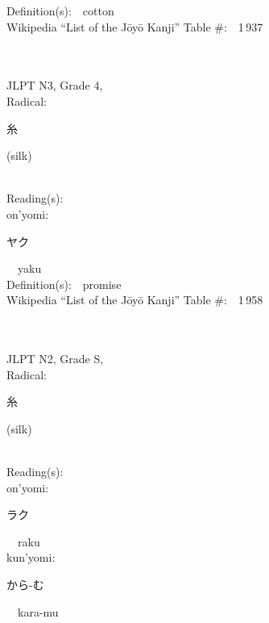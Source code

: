 \begin{multicols}{2}
Definition(s):\ \ cotton \\
Wikipedia ``List of the J\=oy\=o Kanji'' Table \#:\ \ 1\,937 \\
\ \ \\
{\fontsize{34pt}{40pt}  }\ \ \\  %
{JLPT N3, Grade 4, \\Radical:\ \ {\begin{CJK}{UTF8}{min} 糸 \end{CJK}} (silk) } \\
Reading(s):\ \ \\
{\hspace*{1em}}on'yomi:\ \ \\
{\hspace*{2em}}{\begin{CJK}{UTF8}{min} ヤク \end{CJK}}\ \ yaku\ \ \\
Definition(s):\ \ promise \\
Wikipedia ``List of the J\=oy\=o Kanji'' Table \#:\ \ 1\,958 \\
\ \ \\
{\fontsize{34pt}{40pt}  }\ \ \\  %
{JLPT N2, Grade S, \\Radical:\ \ {\begin{CJK}{UTF8}{min} 糸 \end{CJK}} (silk) } \\
Reading(s):\ \ \\
{\hspace*{1em}}on'yomi:\ \ \\
{\hspace*{2em}}{\begin{CJK}{UTF8}{min} ラク \end{CJK}}\ \ raku\ \ \\
{\hspace*{1em}}kun'yomi:\ \ \\
{\hspace*{2em}}{\begin{CJK}{UTF8}{min} から-む \end{CJK}}\ \ kara-mu\ \ \\

\end{multicols}
